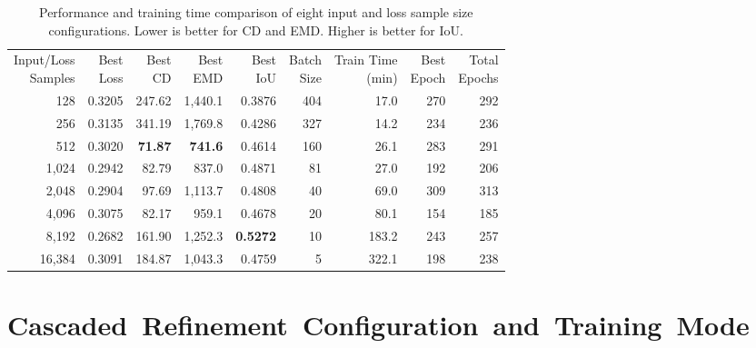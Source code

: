 \begin{table}[!htb]
	\centering
	\singlespace
	\footnotesize
	\setlength{\tabcolsep}{3pt}
	\setcellgapes{4pt}
	\makegapedcells
	\renewcommand{\bfdefault}{b}
	\begin{tabular}{|r|r|r|r|r|r|r|r|r|}
		\hline
		\makecell{Input/Loss\\Samples} & \makecell{Best\\Loss} & \makecell{Best\\CD} & \makecell{Best\\EMD} & \makecell{Best\\IoU} & \makecell{Batch\\Size} & \makecell{Train Time\\(min)} & \makecell{Best\\Epoch} & \makecell{Total\\Epochs} \\
		\Xhline{1pt}
		128   & 0.3205 & 247.62         & 1,440.1         & 0.3876          & 404 & 17.0  & 270 & 292 \\
		256   & 0.3135 & 341.19         & 1,769.8         & 0.4286          & 327 & 14.2  & 234 & 236 \\
		512   & 0.3020 & \textbf{71.87} & \textbf{741.6} & 0.4614          & 160 & 26.1  & 283 & 291 \\
		1,024  & 0.2942 & 82.79          & 837.0          & 0.4871          & 81  & 27.0  & 192 & 206 \\
		2,048  & 0.2904 & 97.69          & 1,113.7         & 0.4808          & 40  & 69.0  & 309 & 313 \\
		4,096  & 0.3075 & 82.17          & 959.1          & 0.4678          & 20  & 80.1  & 154 & 185 \\
		8,192  & 0.2682 & 161.90         & 1,252.3         & \textbf{0.5272} & 10  & 183.2 & 243 & 257 \\
		16,384 & 0.3091 & 184.87         & 1,043.3         & 0.4759          & 5   & 322.1 & 198 & 238 \\
		\hline
	\end{tabular}
	\caption{Performance and training time comparison of eight input and loss sample size configurations. Lower is better for CD and EMD. Higher is better for IoU.}
	\label{tab:input_size_comparison}
\end{table}


\section{Cascaded~Refinement~Configuration~and~Training~Mode}
\label{sec:prims_per_cascade_experiment}

